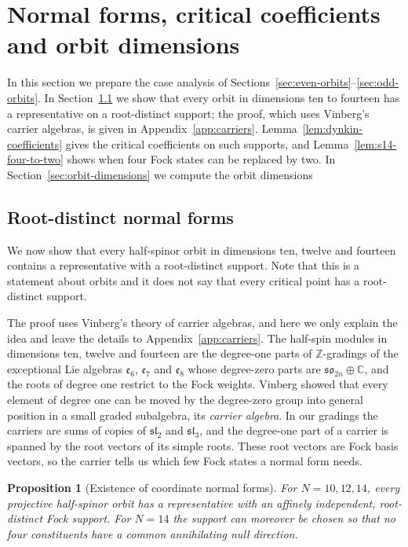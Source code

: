 \documentclass{article}
\newtheorem{proposition}[theorem]{Proposition}
\theoremstyle{definition}
\theoremstyle{remark}
\newcommand{\C}{\mathbb C}
\begin{document}
\section{Normal forms, critical coefficients and orbit dimensions}
\label{sec:normal-forms}

In this section we prepare the case analysis of
Sections~\ref{sec:even-orbits}--\ref{sec:odd-orbits}. In
Section~\ref{sec:root-distinct-exhaustiveness} we show that every orbit
in dimensions ten to fourteen has a representative on a root-distinct
support; the proof, which uses Vinberg's carrier algebras, is given in
Appendix~\ref{app:carriers}. Lemma~\ref{lem:dynkin-coefficients} gives
the critical coefficients on such supports, and
Lemma~\ref{lem:s14-four-to-two} shows when four Fock states can be
replaced by two. In Section~\ref{sec:orbit-dimensions} we compute the
orbit dimensions
\subsection{Root-distinct normal forms}
\label{sec:root-distinct-exhaustiveness}

We now show that every half-spinor orbit in dimensions ten, twelve and
fourteen contains a representative with a root-distinct support. Note that
this is a statement about orbits and it does not say that every critical point
has a root-distinct support.

The proof uses Vinberg's theory of carrier algebras, and here we only explain
the idea and leave the details to Appendix~\ref{app:carriers}. The half-spin
modules in dimensions ten, twelve and fourteen are the degree-one parts of
$\mathbb Z$-gradings of the exceptional Lie algebras $\mathfrak e_6$,
$\mathfrak e_7$ and $\mathfrak e_8$ whose degree-zero parts are
$\mathfrak{so}_{2n}\oplus\C$, and the roots of degree one restrict to the Fock
weights. Vinberg showed that every element of degree one can be moved by the
degree-zero group into general position in a small graded subalgebra, its
\emph{carrier algebra}. In our gradings the carriers are sums of copies of
$\mathfrak{sl}_2$ and $\mathfrak{sl}_3$, and the degree-one part of a carrier is
spanned by the root vectors of its simple roots. These root vectors are Fock
basis vectors, so the carrier tells us which few Fock states a normal form
needs.

\begin{proposition}[Existence of coordinate normal forms]
\label{prop:root-distinct-normal-forms}
For $N=10,12,14$, every projective half-spinor orbit has a representative
with an affinely independent, root-distinct Fock support. For $N=14$
the support can moreover be chosen so that no four constituents have a
common annihilating null direction.
\end{proposition}
\end{document}

